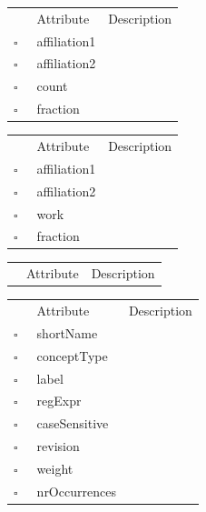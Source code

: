 \clearpage
\begin{table}
\caption{CollabCount  }

\begin{longtable}{llp{8cm}}
& Attribute & Description \\
$\square$\ & affiliation1 &  \\
$\square$\ & affiliation2 &  \\
$\square$\ & count &  \\
$\square$\ & fraction &  \\
\end{longtable}
\label{attr:CollabCount}
\end{table}

\begin{table}
\caption{CollabWork  }

\begin{longtable}{llp{8cm}}
& Attribute & Description \\
$\square$\ & affiliation1 &  \\
$\square$\ & affiliation2 &  \\
$\square$\ & work &  \\
$\square$\ & fraction &  \\
\end{longtable}
\label{attr:CollabWork}
\end{table}

\begin{table}
\caption{Collection  }

\begin{longtable}{llp{8cm}}
& Attribute & Description \\
\end{longtable}
\label{attr:Collection}
\end{table}

\begin{table}
\caption{Concept  }

\begin{longtable}{llp{8cm}}
& Attribute & Description \\
$\square$\ & shortName &  \\
$\square$\ & conceptType &  \\
$\square$\ & label &  \\
$\square$\ & regExpr &  \\
$\square$\ & caseSensitive &  \\
$\square$\ & revision &  \\
$\square$\ & weight &  \\
$\square$\ & nrOccurrences &  \\
\end{longtable}
\label{attr:Concept}
\end{table}

